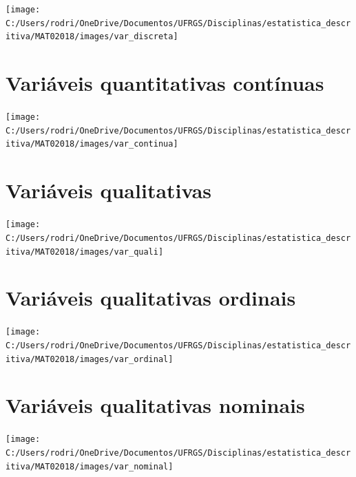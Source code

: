 \documentclass[]{tufte-book}
\begin{document}
\begin{center}\texttt{[image: C:/Users/rodri/OneDrive/Documentos/UFRGS/Disciplinas/estatistica\_descritiva/MAT02018/images/var\_discreta]} \end{center}

\hypertarget{variuxe1veis-quantitativas-contuxednuas}{%
\section{Variáveis quantitativas
contínuas}\label{variuxe1veis-quantitativas-contuxednuas}}

\begin{center}\texttt{[image: C:/Users/rodri/OneDrive/Documentos/UFRGS/Disciplinas/estatistica\_descritiva/MAT02018/images/var\_continua]} \end{center}

\hypertarget{variuxe1veis-qualitativas}{%
\section{Variáveis qualitativas}\label{variuxe1veis-qualitativas}}

\begin{center}\texttt{[image: C:/Users/rodri/OneDrive/Documentos/UFRGS/Disciplinas/estatistica\_descritiva/MAT02018/images/var\_quali]} \end{center}

\hypertarget{variuxe1veis-qualitativas-ordinais}{%
\section{Variáveis qualitativas
ordinais}\label{variuxe1veis-qualitativas-ordinais}}

\begin{center}\texttt{[image: C:/Users/rodri/OneDrive/Documentos/UFRGS/Disciplinas/estatistica\_descritiva/MAT02018/images/var\_ordinal]} \end{center}

\hypertarget{variuxe1veis-qualitativas-nominais}{%
\section{Variáveis qualitativas
nominais}\label{variuxe1veis-qualitativas-nominais}}

\begin{center}\texttt{[image: C:/Users/rodri/OneDrive/Documentos/UFRGS/Disciplinas/estatistica\_descritiva/MAT02018/images/var\_nominal]} \end{center}
\end{document}
